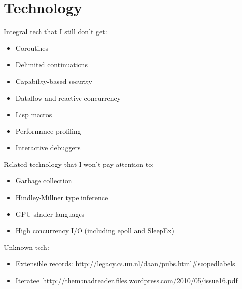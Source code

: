 \chapter{Technology}

Integral tech that I still don't get:

\begin{itemize}
\item Coroutines
\item Delimited continuations
\item Capability-based security
\item Dataflow and reactive concurrency
\item Lisp macros
\item Performance profiling
\item Interactive debuggers
\end{itemize}

Related technology that I won't pay attention to:

\begin{itemize}
\item Garbage collection
\item Hindley-Millner type inference
\item GPU shader languages
\item High concurrency I/O (including epoll and SleepEx)
\end{itemize}

Unknown tech:
\begin{itemize}
\item Extensible records: http://legacy.cs.uu.nl/daan/pubs.html\#scopedlabels
\item Iteratee: http://themonadreader.files.wordpress.com/2010/05/issue16.pdf
\end{itemize}
